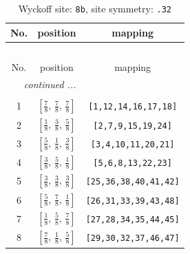 \documentclass[fleqn,8pt]{jsarticle}
\begin{document}
\begin{longtable}{ccc}
\caption{Wyckoff site: {\tt 8b}, site symmetry: {\tt .32}}
 \\
 \hline \hline
No. & position & mapping \\ \hline \endfirsthead

\multicolumn{2}{l}{\tablename\ \thetable{}} \\
 \hline \hline
No. & position & mapping \\ \hline \endhead

 \hline \hline
\multicolumn{2}{r}{\footnotesize\it continued ...} \\ \endfoot

 \hline \hline
\multicolumn{2}{r}{} \\ \endlastfoot

1 & $\left[ \frac{7}{8},\, \frac{7}{8},\, \frac{7}{8} \right]$ & {\tt [1,12,14,16,17,18]} \\ \hline
2 & $\left[ \frac{1}{8},\, \frac{3}{8},\, \frac{5}{8} \right]$ & {\tt [2,7,9,15,19,24]} \\ \hline
3 & $\left[ \frac{5}{8},\, \frac{1}{8},\, \frac{3}{8} \right]$ & {\tt [3,4,10,11,20,21]} \\ \hline
4 & $\left[ \frac{3}{8},\, \frac{5}{8},\, \frac{1}{8} \right]$ & {\tt [5,6,8,13,22,23]} \\ \hline
5 & $\left[ \frac{3}{8},\, \frac{3}{8},\, \frac{3}{8} \right]$ & {\tt [25,36,38,40,41,42]} \\ \hline
6 & $\left[ \frac{5}{8},\, \frac{7}{8},\, \frac{1}{8} \right]$ & {\tt [26,31,33,39,43,48]} \\ \hline
7 & $\left[ \frac{1}{8},\, \frac{5}{8},\, \frac{7}{8} \right]$ & {\tt [27,28,34,35,44,45]} \\ \hline
8 & $\left[ \frac{7}{8},\, \frac{1}{8},\, \frac{5}{8} \right]$ & {\tt [29,30,32,37,46,47]} \\
\end{longtable}
\renewcommand{\arraystretch}{1.2}
\end{document}
